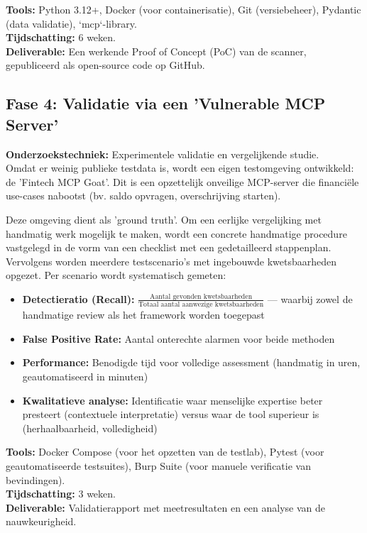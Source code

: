 \textbf{Tools:} Python 3.12+, Docker (voor containerisatie), Git (versiebeheer), Pydantic (data validatie), `mcp`-library. \\
\textbf{Tijdschatting:} 6 weken. \\
\textbf{Deliverable:} Een werkende Proof of Concept (PoC) van de scanner, gepubliceerd als open-source code op GitHub.

\subsection{Fase 4: Validatie via een 'Vulnerable MCP Server'}

\textbf{Onderzoekstechniek:} Experimentele validatie en vergelijkende studie. \\
Omdat er weinig publieke testdata is, wordt een eigen testomgeving ontwikkeld: de 'Fintech MCP Goat'. Dit is een opzettelijk onveilige MCP-server die financiële use-cases nabootst (bv. saldo opvragen, overschrijving starten). 

Deze omgeving dient als 'ground truth'. Om een eerlijke vergelijking met handmatig werk mogelijk te maken, wordt een concrete handmatige procedure vastgelegd in de vorm van een checklist met een gedetailleerd stappenplan. Vervolgens worden meerdere testscenario's met ingebouwde kwetsbaarheden opgezet. Per scenario wordt systematisch gemeten:
\begin{itemize}
    \item \textbf{Detectieratio (Recall):} $\frac{\text{Aantal gevonden kwetsbaarheden}}{\text{Totaal aantal aanwezige kwetsbaarheden}}$ — waarbij zowel de handmatige review als het framework worden toegepast
    \item \textbf{False Positive Rate:} Aantal onterechte alarmen voor beide methoden
    \item \textbf{Performance:} Benodigde tijd voor volledige assessment (handmatig in uren, geautomatiseerd in minuten)
    \item \textbf{Kwalitatieve analyse:} Identificatie waar menselijke expertise beter presteert (contextuele interpretatie) versus waar de tool superieur is (herhaalbaarheid, volledigheid)
\end{itemize}

\textbf{Tools:} Docker Compose (voor het opzetten van de testlab), Pytest (voor geautomatiseerde testsuites), Burp Suite (voor manuele verificatie van bevindingen). \\
\textbf{Tijdschatting:} 3 weken. \\
\textbf{Deliverable:} Validatierapport met meetresultaten en een analyse van de nauwkeurigheid.


